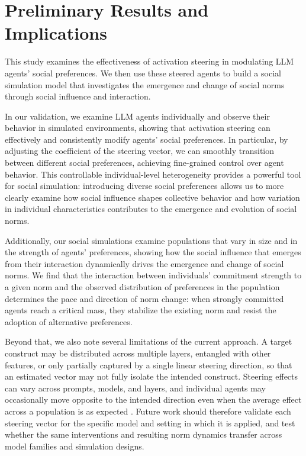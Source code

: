 \documentclass[onecolumn]{main}
\begin{document}
\section{Preliminary Results and Implications}

This study examines the effectiveness of activation steering in modulating LLM agents' social preferences. We then use these steered agents to build a social simulation model that investigates the emergence and change of social norms through social influence and interaction.


In our validation, we examine LLM agents individually and observe their behavior in simulated environments, showing that activation steering can effectively and consistently modify agents' social preferences. In particular, by adjusting the coefficient of the steering vector, we can smoothly transition between different social preferences, achieving fine-grained control over agent behavior. This controllable individual-level heterogeneity provides a powerful tool for social simulation: introducing diverse social preferences allows us to more clearly examine how social influence shapes collective behavior and how variation in individual characteristics contributes to the emergence and evolution of social norms.

Additionally, our social simulations examine populations that vary in size and in the strength of agents' preferences, showing how the social influence that emerges from their interaction dynamically drives the emergence and change of social norms. We find that the interaction between individuals' commitment strength to a given norm and the observed distribution of preferences in the population determines the pace and direction of norm change: when strongly committed agents reach a critical mass, they stabilize the existing norm and resist the adoption of alternative preferences.

Beyond that, we also note several limitations of the current approach. A target construct may be distributed across multiple layers, entangled with other features, or only partially captured by a single linear steering direction, so that an estimated vector may not fully isolate the intended construct. Steering effects can vary across prompts, models, and layers, and individual agents may occasionally move opposite to the intended direction even when the average effect across a population is as expected \citep{braun2025}. Future work should therefore validate each steering vector for the specific model and setting in which it is applied, and test whether the same interventions and resulting norm dynamics transfer across model families and simulation designs.
\end{document}
